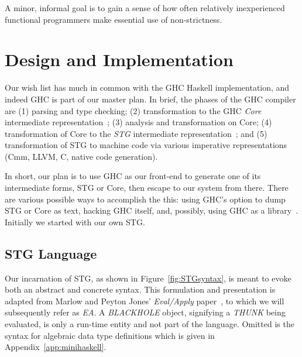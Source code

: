 \documentclass{llncs}
\renewcommand{\floatpagefraction}{0.99}
\begin{document}
A minor, informal goal is to gain a sense of how often relatively
inexperienced functional programmers make essential use of non-strictness.

\section{Design and Implementation}
Our wish list has much in common with the GHC Haskell implementation, and
indeed GHC is part of our master plan.  In brief, the phases of the GHC
compiler are (1) parsing and type checking; (2) transformation to the GHC
\emph{Core} intermediate representation~\cite{Sulzmann:2007,ghc-core}; (3)
analysis and transformation on Core; (4) transformation of Core to the
\emph{STG} intermediate representation~\cite{PJ-stockhardware}; and (5)
transformation of STG to machine code via various imperative
representations (Cmm, LLVM, C, native code generation).

In short, our plan is to use GHC as our front-end to generate one of its
intermediate forms, STG or Core, then escape to our system from there.  There
are various possible ways to accomplish the this: using GHC's option to dump
STG or Core as text, hacking GHC itself, and, possibly, using GHC as a
library~\cite{ghc-as-library}.  Initially we started with our own STG.

\subsection{STG Language}
\renewcommand{\floatpagefraction}{0.99}

Our incarnation of STG, as shown in Figure~\ref{fig:STGsyntax}, is meant to
evoke both an abstract and concrete syntax.  This formulation and presentation
is adapted from Marlow and Peyton Jones' \emph{Eval/Apply}
paper~\cite{Marlow:2004}, to which we will subsequently refer as \emph{EA}\@.
A \emph{BLACKHOLE} object, signifying a \emph{THUNK} being evaluated, is only
a run-time entity and not part of the language.  Omitted is the syntax for
algebraic data type definitions which is given in
Appendix~\ref{app:minihaskell}.
\end{document}
